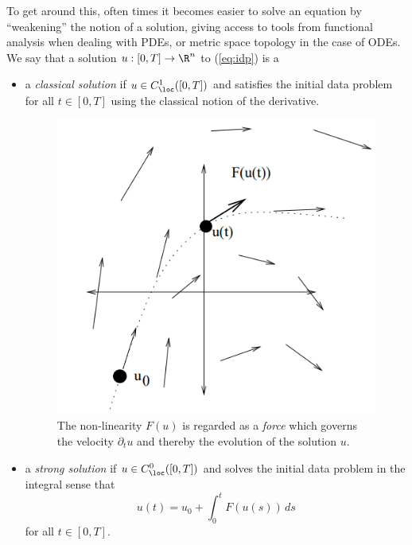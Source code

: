 To get around this, often times it becomes easier to solve an equation by ``weakening'' the notion of a solution, giving access to tools from functional analysis when dealing with PDEs, or metric space topology in the case of ODEs. We say that a solution $u : [0, T] \to \R^n$ to (\ref{eq:idp}) is a
\begin{itemize}
	\item a \emph{classical solution} if $u \in C^1_\loc ([0, T])$ and satisfies the initial data problem for all $t \in [0, T]$ using the classical notion of the derivative. 
	
	\begin{figure}[h]
		\begin{center}
			\includegraphics[scale = 0.5]{classical}
			\caption{The non-linearity $F(u)$ is regarded as a \textit{force} which governs the velocity $\partial_t u$ and thereby the evolution of the solution $u$.}
		\end{center}
	\end{figure}
	
	\item a \emph{strong solution} if $u \in C^0_\loc ([0, T])$ and solves the initial data problem in the integral sense that 
					\[ u(t) = u_0 + \int_0^t F(u(s))\, ds \]
				for all $t \in [0, T]$. 	
				

\end{itemize}

